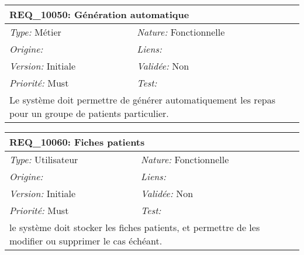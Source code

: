 \begin{table}[!h]

\begin{tabular}{|p{60mm}p{100mm}|}

\hline

\multicolumn{2}{|l|}{\textbf{REQ\_10050:} Génération automatique} \\ \hline

\emph{Type:} Métier & \emph{Nature:} Fonctionnelle \\

\emph{Origine:}  & \emph{Liens:}  \\

\emph{Version:} Initiale & \emph{Validée:} Non \\

\emph{Priorité:} Must & \emph{Test:} \\ \hline

\multicolumn{2}{|p{16cm}|}{Le système doit permettre de générer automatiquement les repas pour un groupe de patients particulier.} \\ \hline

\end{tabular}

\end{table}



\begin{table}[!h]

\begin{tabular}{|p{60mm}p{100mm}|}

\hline

\multicolumn{2}{|l|}{\textbf{REQ\_10060:} Fiches patients} \\ \hline

\emph{Type:} Utilisateur & \emph{Nature:} Fonctionnelle \\

\emph{Origine:}  & \emph{Liens:}  \\

\emph{Version:} Initiale & \emph{Validée:} Non \\

\emph{Priorité:} Must & \emph{Test:} \\ \hline

\multicolumn{2}{|p{16cm}|}{le système doit stocker les fiches patients, et permettre de les modifier ou supprimer le cas échéant.} \\ \hline

\end{tabular}

\end{table}



